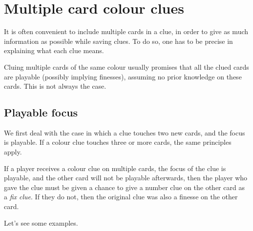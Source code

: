 \section{Multiple card colour clues}

It is often convenient to include multiple cards in a clue, in order to give as much information as possible while saving clues. To do so, one has to be precise in explaining what each clue means.

Cluing multiple cards of the same colour usually promises that all the clued cards are playable (possibly implying finesses), assuming no prior knowledge on these cards. This is not always the case.

\subsection{Playable focus}

We first deal with the case in which a clue touches two new cards, and the focus is playable. If a colour clue touches three or more cards, the same principles apply.

\begin{convention}
	\label{delayed-finesse}
	If a player receives a colour clue on multiple cards, the focus of the clue is playable, and the other card will not be playable afterwards, then the player who gave the clue must be given a chance to give a number clue on the other card as a \emph{fix clue}. If they do not, then the original clue was also a finesse on the other card.
\end{convention}

Let's see some examples.

